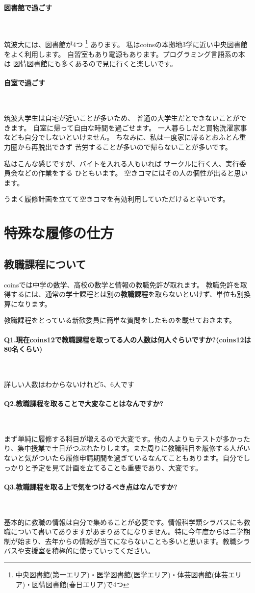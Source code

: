 \documentclass[a4j]{jsarticle}
\newcommand{\bold}[1]{{\bfseries #1}}
\newcommand{\parapara}[1]{\paragraph{#1}~\par}
\begin{document}
\parapara{図書館で過ごす}
筑波大には、図書館が4つ
\footnote{中央図書館(第一エリア)・医学図書館(医学エリア)・体芸図書館(体芸エリア)・図情図書館(春日エリア)で4つ}
あります。
私はcoinsの本拠地3学に近い中央図書館をよく利用します。
自習室もあり電源もあります。プログラミング言語系の本は
図情図書館にも多くあるので見に行くと楽しいです。

\parapara{自室で過ごす}
筑波大学生は自宅が近いことが多いため、
普通の大学生だとできないことができます。
自室に帰って自由な時間を過ごせます。
一人暮らしだと買物洗濯家事なども自分でしないといけません。
ちなみに、私は一度家に帰るとおふとん重力圏から再脱出できず
苦労することが多いので帰らないことが多いです。

\vspace{5mm}
私はこんな感じですが、バイトを入れる人もいれば
サークルに行く人、実行委員会などの作業をする
ひともいます。
空きコマにはその人の個性が出ると思います。

うまく履修計画を立てて空きコマを有効利用していただけると幸いです。


\section{特殊な履修の仕方}
\subsection{教職課程について}
coinsでは中学の数学、高校の数学と情報の教職免許が取れます。
教職免許を取得するには、通常の学士課程とは別の\bold{教職課程}を取らないといけず、単位も別換算になります。

教職課程をとっている新歓委員に簡単な質問をしたものを載せておきます。

\parapara{Q1.現在coins12で教職課程を取ってる人の人数は何人ぐらいですか?(coins12は80名くらい)}
詳しい人数はわからないけれど5、6人です

\parapara{Q2.教職課程を取ることで大変なことはなんですか?}
まず単純に履修する科目が増えるので大変です。他の人よりもテストが多かったり、集中授業で土日がつぶれたりします。また周りに教職科目を履修する人がいないと気がついたら履修申請期間を過ぎているなんてこともあります。自分でしっかりと予定を見て計画を立てることも重要であり、大変です。

\parapara{Q3.教職課程を取る上で気をつけるべき点はなんですか?}
基本的に教職の情報は自分で集めることが必要です。情報科学類シラバスにも教職について書いてありますがあまりあてになりません。特に今年度からは二学期制が始まり、去年からの情報が当てにならないことも多いと思います。教職シラバスや支援室を積極的に使っていってください。
\end{document}
